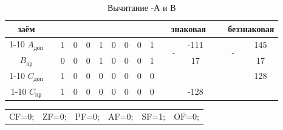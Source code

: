 \begin{table}[H]
    \centering
    \caption{Вычитание -А и В}
    \begin{tabular}{c|cc|cccccccp{1cm}ccp{0.5cm}cc}
		\small заём & & & & & & & & & & & \multicolumn{2}{c}{знаковая} & \  & \multicolumn{2}{c}{беззнаковая}  \\
		\cline{1-10} \cline{12-13} \cline{15-16}
		$A_{\text{доп}}$ & & 1 & 0 & 0 & 1 & 0 & 0 & 0 & 1 & & \multirow{2}{*}{-} & -111 & \  & \multirow{2}{*}{-} & 145   \\
		$B_{\text{пр}}$ & & 0 & 0 & 0 & 1 & 0 & 0 & 0 & 1 & & & 17 & \  &  & 17\\
		\cline{1-10} \cline{12-13} \cline{15-16}
		$C_{\text{доп}}$ & & 1 & 0 & 0 & 0 & 0 & 0 & 0 & 0 & & & & \  &  & 128 \\
		\cline{1-10} \cline{12-13} \cline{15-16}
		$C_{\text{пр}}$ & & 1 & 0 & 0 & 0 & 0 & 0 & 0 & 0 & & & -128 & \  &  & \\
    \end{tabular}
\end{table}

\begin{table}[H]
    \centering
    \begin{tabular}{cccccc}
        CF=0; & ZF=0; & PF=0; & AF=0; & SF=1; & OF=0;
    \end{tabular}
\end{table}

